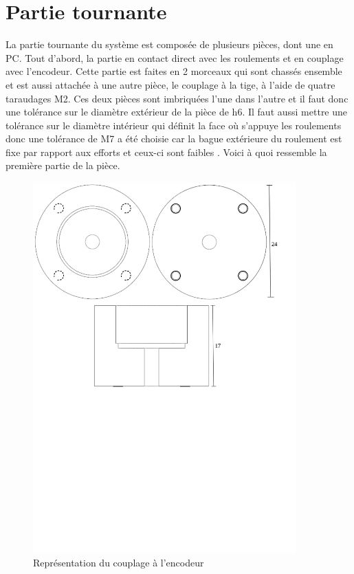 \section{Partie tournante}\label{sec:PartieTour}
La partie tournante du système est composée de plusieurs pièces, dont une en \acrshort{PC}. Tout d'abord, la partie en contact direct
avec les roulements et en couplage avec l'encodeur. Cette partie est faites en 2 morceaux qui sont chassés ensemble et est aussi attachée
à une autre pièce, le couplage à la tige, à l'aide de quatre taraudages M2. Ces deux pièces sont imbriquées l'une dans l'autre et il faut donc
une tolérance sur le diamètre extérieur de la pièce de h6. Il faut aussi mettre une tolérance sur le diamètre intérieur qui définit la face où
s'appuye les roulements donc une tolérance de M7 a été choisie car la bague extérieure du roulement est fixe par rapport aux efforts et ceux-ci
sont faibles \cite{Ajustements}. Voici à quoi ressemble la première partie de la pièce.

\begin{figure}[H]
    \centering
    \includegraphics[width = 0.9\textwidth]{assets/figures/CouplageEncodeur.svg}
    \caption{Représentation du couplage à l'encodeur}
    \label{fig:CouplEnco}
\end{figure}

